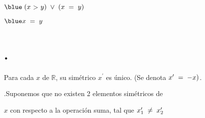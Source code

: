 \documentclass[12pt]{article}
\renewcommand{\qedsymbol}{$\blacksquare$}
\begin{document}
\begin{center}
    \hspace{2.6cm}\Longleftrightarrow \hspace{0.2cm}$\blue \hspace{0.1cm}(x\hspace{0.1cm}$>$\hspace{0.1cm}y)\hspace{0.1cm}\vee \hspace{0.1cm}(x\hspace{0.1cm}=\hspace{0.1cm}y) \hspace{1cm}$ 
\end{center}\vspace{1cm}


\begin{center}
     \hspace{2cm}\Longleftrightarrow \hspace{0.2cm}$\blue x\hspace{0.1cm}=\hspace{0.1cm}y \hspace{1cm}$ \hspace{1cm}
    \hspace{1cm} \vspace{1cm}
    
    \hspace{10cm} \textup{\black{\qedsymbol}}\hspace{0.2cm}\textup{} 
\end{center}\vspace{0.5cm}

\section*{ .} 

Para cada $x$ de $\mathbb{R}$, su simétrico $x^{\prime}$ es único. (Se denota $x^{\prime}\hspace{0.1cm}=\hspace{0.1cm}-x)$. \vspace{0.2cm} \vspace{0.2cm}

{}  {}.Suponemos que no existen 2 elementos simétricos de \par $x$ con respecto a la operación suma, tal que $x_1^{\prime}\hspace{0.1cm}\neq\hspace{0.1cm}x_2^{\prime}$\vspace{1cm}
\end{document}
